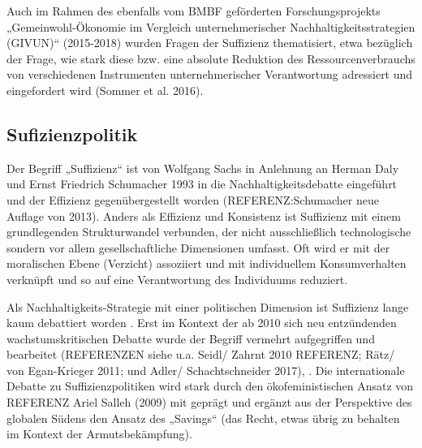 \documentclass[a4paper,11pt,twoside]{scrartcl}
\begin{document}
Auch im Rahmen des ebenfalls vom BMBF geförderten Forschungsprojekts „Gemeinwohl-Ökonomie im Vergleich unternehmerischer Nachhaltigkeitsstrategien (GIVUN)“ (2015-2018) wurden Fragen der Suffizienz thematisiert, etwa bezüglich der Frage, wie stark diese bzw. eine absolute Reduktion des Ressourcenverbrauchs von verschiedenen Instrumenten unternehmerischer Verantwortung adressiert und eingefordert wird (Sommer et al. 2016).
    
\subsection*{Sufizienzpolitik}
Der Begriff „Suffizienz“ ist von Wolfgang Sachs in Anlehnung an Herman Daly und Ernst Friedrich Schumacher 1993 in die Nachhaltigkeitsdebatte eingeführt und der Effizienz gegenübergestellt worden \cite{Sachs1993,Daly1991} (REFERENZ:Schumacher neue Auflage von 2013). Anders als Effizienz und Konsistenz ist Suffizienz mit einem grundlegenden Strukturwandel verbunden, der nicht ausschließlich technologische sondern vor allem gesellschaftliche Dimensionen umfasst. Oft wird er mit der moralischen Ebene (Verzicht) assoziiert und mit individuellem Konsumverhalten verknüpft und so auf eine Verantwortung des Individuums reduziert.

Als Nachhaltigkeits-Strategie mit einer politischen Dimension ist Suffizienz lange kaum debattiert worden \cite{Winterfeld 2002}.  Erst im Kontext der ab 2010 sich neu entzündenden wachstumskritischen Debatte wurde der Begriff vermehrt aufgegriffen und bearbeitet (REFERENZEN siehe u.a. Seidl/ Zahrnt 2010 REFERENZ; Rätz/ von Egan-Krieger 2011; und Adler/ Schachtschneider 2017), \cite{Schneidewind2013,Winterfeld2017,Linz2015,Bierwirth2015,Thomas2015}. Die internationale Debatte zu Suffizienzpolitiken wird stark durch den ökofeministischen Ansatz von REFERENZ Ariel Salleh (2009) mit geprägt und ergänzt aus der Perspektive des globalen Südens den Ansatz des „Savings“ (das Recht, etwas übrig zu behalten im Kontext der Armutsbekämpfung).
\end{document}

